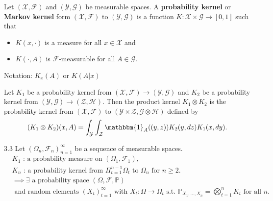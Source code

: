 \documentclass[10pt]{article}
\newenvironment{theorem*}[1]{%
  \IfBlankTF{#1}
    {\renewcommand{\themanualtheoreminner}{\unskip}}
    {\renewcommand\themanualtheoreminner{#1}}%
  \manualtheoreminner
}{\endmanualtheoreminner}
\theoremstyle{definition}
\newenvironment{definition*}[1]{%
  \IfBlankTF{#1}
    {\renewcommand{\themanualdefinitioninner}{\unskip}}
    {\renewcommand\themanualdefinitioninner{#1}}%
  \manualdefinitioninner
}{\endmanualdefinitioninner}
\begin{document}
\begin{definition*}{}
    Let $(\mathcal{X}, \mathcal{F})$ and $(\mathcal{Y}, \mathcal{G})$ be measurable spaces. 
    A \textbf{probability kernel} or \textbf{Markov kernel} form $(\mathcal{X}, \mathcal{F})$ to $(\mathcal{Y}, \mathcal{G})$ is a function $K : \mathcal{X} \times \mathcal{G} \rightarrow [0,1]$ such that
    \begin{itemize}
        \item[(a)] $K(x,\cdot)$ is a measure for all $x \in \mathcal{X}$ and
        \item[(b)] $K(\cdot,A)$ is $\mathcal{F}$-measurable for all $A \in \mathcal{G}$. 
    \end{itemize}
    Notation: $K_x(A)$ or $K(A|x)$
\end{definition*}

\begin{definition*}{}
    Let $K_1$ be a probability kernel from $(\mathcal{X}, \mathcal{F}) \rightarrow (\mathcal{Y},\mathcal{G})$ and $K_2$ be a probability kernel from $(\mathcal{Y}, \mathcal{G}) \rightarrow (\mathcal{Z},\mathcal{H})$.
    Then the product kernel $K_1 \otimes K_2$ is the probability kernel from $(\mathcal{X}, \mathcal{F})$ to $(\mathcal{Y} \times \mathcal{Z}, \mathcal{G} \otimes \mathcal{H})$ defined by
    \begin{equation*}
        (K_1 \otimes K_2)(x,A)= \int_{\mathcal{Y}}\int_{\mathcal{Z}}\mathbbm{1}_A ((y,z))K_2 (y,dz) K_1 (x,dy).
    \end{equation*}
\end{definition*}

\begin{theorem*}{3.3}
    Let $(\Omega_n, \mathcal{F}_n)_{n=1}^\infty$ be a sequence of measurable spaces.
    \begin{align*}
    & K_1 \text{ : a probability measure on } (\Omega_1, \mathcal{F}_1) \text{, } \\
    & K_n \text{ : a probability kernel from } \Pi_{t=1}^{n-1} \Omega_t \text{ to } \Omega_n \text{ for } n \geq 2. \\
    & \implies \exists \text{ a probability space } (\Omega, \mathcal{F}, \mathbb{P}) \\
    & \text{ and random elements } (X_t)_{t=1}^\infty \text{ with } X_t : \Omega \rightarrow \Omega_t \text{ s.t. } \mathbb{P}_{X_1, \ldots, X_n} = \bigotimes_{t=1}^n K_t \text{ for all } n.
    \end{align*} 
\end{theorem*}
\end{document}
